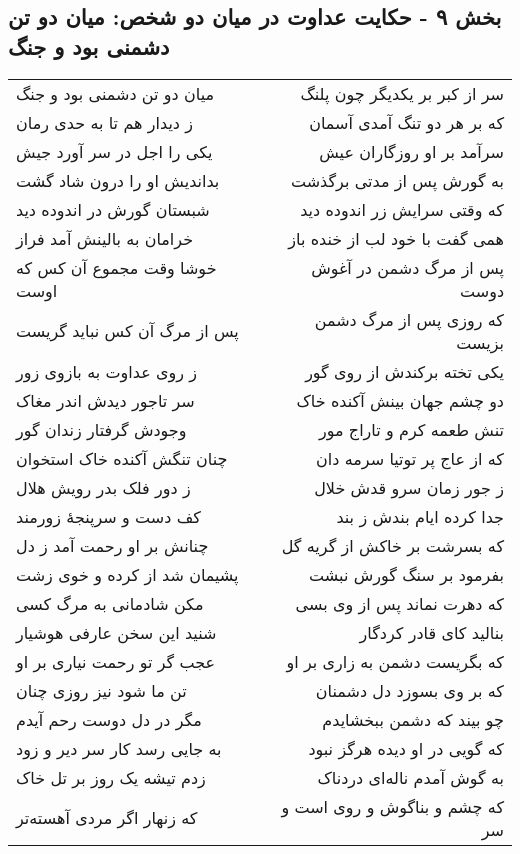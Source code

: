 \begin{center}
\section*{بخش ۹ - حکایت عداوت در میان دو شخص: میان دو تن دشمنی بود و جنگ}
\label{sec:009}
\begin{longtable}{l p{0.5cm} r}
میان دو تن دشمنی بود و جنگ
&&
سر از کبر بر یکدیگر چون پلنگ
\\
ز دیدار هم تا به حدی رمان
&&
که بر هر دو تنگ آمدی آسمان
\\
یکی را اجل در سر آورد جیش
&&
سرآمد بر او روزگاران عیش
\\
بداندیش او را درون شاد گشت
&&
به گورش پس از مدتی برگذشت
\\
شبستان گورش در اندوده دید
&&
که وقتی سرایش زر اندوده دید
\\
خرامان به بالینش آمد فراز
&&
همی گفت با خود لب از خنده باز
\\
خوشا وقت مجموع آن کس که اوست
&&
پس از مرگ دشمن در آغوش دوست
\\
پس از مرگ آن کس نباید گریست
&&
که روزی پس از مرگ دشمن بزیست
\\
ز روی عداوت به بازوی زور
&&
یکی تخته برکندش از روی گور
\\
سر تاجور دیدش اندر مغاک
&&
دو چشم جهان بینش آکنده خاک
\\
وجودش گرفتار زندان گور
&&
تنش طعمه کرم و تاراج مور
\\
چنان تنگش آکنده خاک استخوان
&&
که از عاج پر توتیا سرمه دان
\\
ز دور فلک بدر رویش هلال
&&
ز جور زمان سرو قدش خلال
\\
کف دست و سرپنجهٔ زورمند
&&
جدا کرده ایام بندش ز بند
\\
چنانش بر او رحمت آمد ز دل
&&
که بسرشت بر خاکش از گریه گل
\\
پشیمان شد از کرده و خوی زشت
&&
بفرمود بر سنگ گورش نبشت
\\
مکن شادمانی به مرگ کسی
&&
که دهرت نماند پس از وی بسی
\\
شنید این سخن عارفی هوشیار
&&
بنالید کای قادر کردگار
\\
عجب گر تو رحمت نیاری بر او
&&
که بگریست دشمن به زاری بر او
\\
تن ما شود نیز روزی چنان
&&
که بر وی بسوزد دل دشمنان
\\
مگر در دل دوست رحم آیدم
&&
چو بیند که دشمن ببخشایدم
\\
به جایی رسد کار سر دیر و زود
&&
که گویی در او دیده هرگز نبود
\\
زدم تیشه یک روز بر تل خاک
&&
به گوش آمدم ناله‌ای دردناک
\\
که زنهار اگر مردی آهسته‌تر
&&
که چشم و بناگوش و روی است و سر
\\
\end{longtable}
\end{center}

